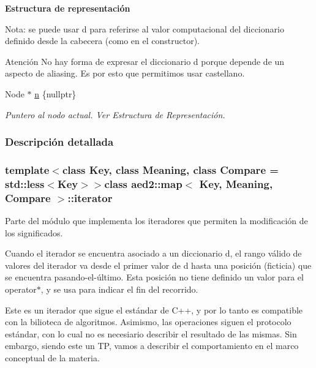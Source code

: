\begin{Indent}{\bf Estructura de representación}
{Nota\-: se puede usar {\ttfamily d} para referirse al valor computacional del diccionario definido desde la cabecera (como en el constructor).

\begin{DoxyAttention}{Atención}
No hay forma de expresar el diccionario {\ttfamily d} porque depende de un aspecto de aliasing. Es por esto que permitimos usar castellano. 
\end{DoxyAttention}
}\begin{DoxyCompactItemize}
\item 
Node $\ast$ \hyperlink{classaed2_1_1map_1_1iterator_adf8633ef71bb6c1fc01c0abe8728fd93_adf8633ef71bb6c1fc01c0abe8728fd93}{n} \{nullptr\}
\begin{DoxyCompactList}\small\item\em Puntero al nodo actual. Ver Estructura de Representación. \end{DoxyCompactList}\end{DoxyCompactItemize}
\end{Indent}


\subsubsection{Descripción detallada}
\subsubsection*{template$<$class Key, class Meaning, class Compare = std\-::less$<$\-Key$>$$>$class aed2\-::map$<$ Key, Meaning, Compare $>$\-::iterator}

Parte del módulo que implementa los iteradores que permiten la modificación de los significados. 

Cuando el iterador se encuentra asociado a un diccionario {\ttfamily d}, el rango válido de valores del iterador va desde el primer valor de {\ttfamily d} hasta una posición (ficticia) que se encuentra pasando-\/el-\/último. Esta posición no tiene definido un valor para el {\ttfamily operator$\ast$}, y se usa para indicar el fin del recorrido.

Este es un iterador que sigue el estándar de C++, y por lo tanto es compatible con la bilioteca de algoritmos. Asimismo, las operaciones siguen el protocolo estándar, con lo cual no es necesiario describir el resultado de las mismas. Sin embargo, siendo este un T\-P, vamos a describir el comportamiento en el marco conceptual de la materia.

